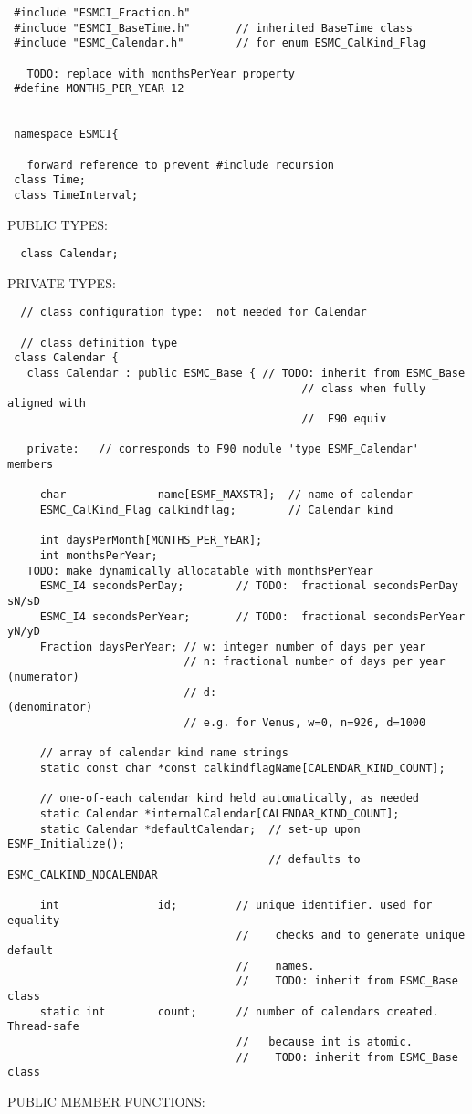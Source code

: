 \begin{verbatim} #include "ESMCI_Fraction.h"
 #include "ESMCI_BaseTime.h"       // inherited BaseTime class
 #include "ESMC_Calendar.h"        // for enum ESMC_CalKind_Flag
 
   TODO: replace with monthsPerYear property
 #define MONTHS_PER_YEAR 12
 
 
 namespace ESMCI{
 
   forward reference to prevent #include recursion
 class Time;
 class TimeInterval;
 \end{verbatim}{\sf PUBLIC TYPES:}
\begin{verbatim}  class Calendar;
 \end{verbatim}{\sf PRIVATE TYPES:}
\begin{verbatim}  // class configuration type:  not needed for Calendar
 
  // class definition type
 class Calendar {
   class Calendar : public ESMC_Base { // TODO: inherit from ESMC_Base
                                             // class when fully aligned with
                                             //  F90 equiv
 
   private:   // corresponds to F90 module 'type ESMF_Calendar' members
 
     char              name[ESMF_MAXSTR];  // name of calendar
     ESMC_CalKind_Flag calkindflag;        // Calendar kind
 
     int daysPerMonth[MONTHS_PER_YEAR];
     int monthsPerYear;
   TODO: make dynamically allocatable with monthsPerYear
     ESMC_I4 secondsPerDay;        // TODO:  fractional secondsPerDay  sN/sD
     ESMC_I4 secondsPerYear;       // TODO:  fractional secondsPerYear yN/yD
     Fraction daysPerYear; // w: integer number of days per year
                           // n: fractional number of days per year (numerator)
                           // d:                                    (denominator)
                           // e.g. for Venus, w=0, n=926, d=1000
 
     // array of calendar kind name strings
     static const char *const calkindflagName[CALENDAR_KIND_COUNT];
 
     // one-of-each calendar kind held automatically, as needed
     static Calendar *internalCalendar[CALENDAR_KIND_COUNT];
     static Calendar *defaultCalendar;  // set-up upon ESMF_Initialize();
                                        // defaults to ESMC_CALKIND_NOCALENDAR
 
     int               id;         // unique identifier. used for equality
                                   //    checks and to generate unique default
                                   //    names.
                                   //    TODO: inherit from ESMC_Base class
     static int        count;      // number of calendars created. Thread-safe
                                   //   because int is atomic.
                                   //    TODO: inherit from ESMC_Base class
 \end{verbatim}{\sf PUBLIC MEMBER FUNCTIONS:}
